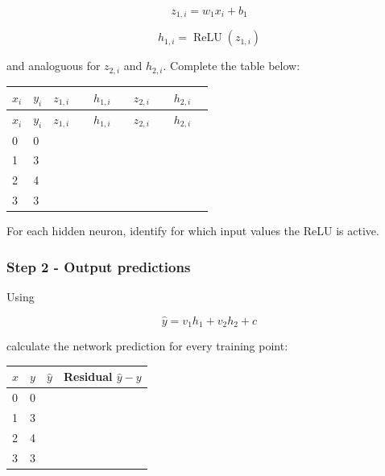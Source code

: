 \documentclass{course_sheet}
\begin{document}
\[
z_{1,i}=w_1x_i+b_1
\]

\[
h_{1,i}=\operatorname{ReLU}(z_{1,i})
\]

and analoguous for $z_{2,i}$ and $h_{2,i}$. Complete the table below:

\begingroup
\small
\setlength{\tabcolsep}{4pt}
\begin{longtable}{l|l|l|l|l|l}
$x_i$ & $y_i$ & $z_{1,i}$ & $h_{1,i}$ & $z_{2,i}$ & $h_{2,i}$ \\[1.5pt]
\hline
\endfirsthead
$x_i$ & $y_i$ & $z_{1,i}$ & $h_{1,i}$ & $z_{2,i}$ & $h_{2,i}$ \\[1.5pt]
\hline
\endhead
\rule{0pt}{2.4ex}0 & 0 &  $\phantom{-0.00}$ &  $\phantom{-0.00}$ &  $\phantom{-0.00}$ &  $\phantom{-0.00}$ \\[3pt]
\rule{0pt}{2.4ex}1 & 3 &  $\phantom{-0.00}$ &  $\phantom{-0.00}$ &  $\phantom{-0.00}$ &  $\phantom{-0.00}$ \\[3pt]
\rule{0pt}{2.4ex}2 & 4 &  $\phantom{-0.00}$ &  $\phantom{-0.00}$ &  $\phantom{-0.00}$ &  $\phantom{-0.00}$ \\[3pt]
\rule{0pt}{2.4ex}3 & 3 &  $\phantom{-0.00}$ &  $\phantom{-0.00}$ &  $\phantom{-0.00}$ &  $\phantom{-0.00}$ \\[3pt]
\end{longtable}
\endgroup
For each hidden neuron, identify for which input values the ReLU is active.

\subsubsection*{Step 2 - Output predictions}
Using

\[
\hat y=v_1h_1+v_2h_2+c
\]

calculate the network prediction for every training point:


\begin{center}
\begingroup
\small
\setlength{\tabcolsep}{4pt}
\begin{tabular}{l|l|l|l}
$x$ & $y$ & $\hat y$ & Residual $\hat y-y$ \\ \hline
\rule{0pt}{2.4ex}0 & 0 & $\phantom{0}$ & $\phantom{0}$ \\[3pt]
\rule{0pt}{2.4ex}1 & 3 & $\phantom{0}$ & $\phantom{0}$ \\[3pt]
\rule{0pt}{2.4ex}2 & 4 & $\phantom{0}$ & $\phantom{0}$ \\[3pt]
\rule{0pt}{2.4ex}3 & 3 & $\phantom{0}$ & $\phantom{0}$ \\[3pt]
\end{tabular}
\endgroup
\end{center}
\end{document}
